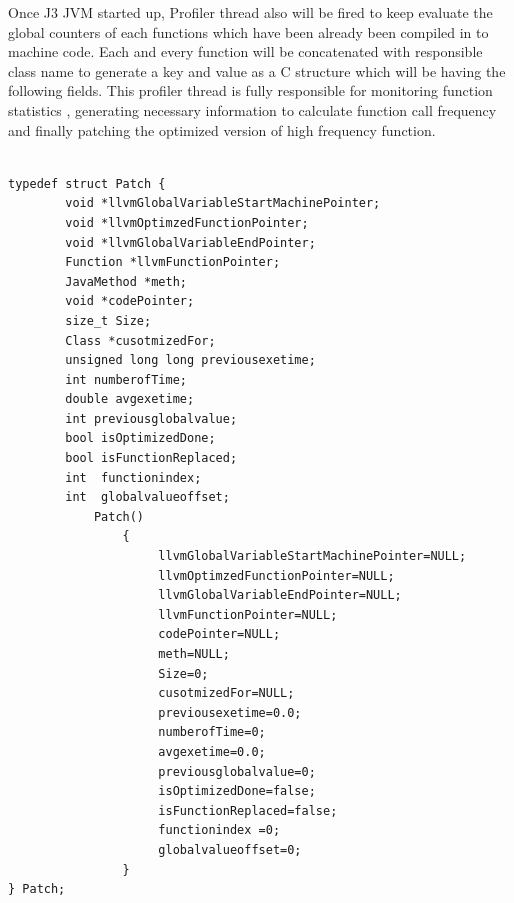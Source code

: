 Once J3 JVM started up, Profiler thread also will be fired to keep evaluate the global counters of each functions which have been already been compiled in to machine code.  Each and every function will be concatenated with responsible class name to generate a key and value as a C structure which will be having the following fields. This profiler thread is fully responsible for monitoring function statistics , generating necessary information to calculate function call frequency and finally patching the optimized version of high frequency function.
\scriptsize\begin{verbatim}
      
typedef struct Patch {
        void *llvmGlobalVariableStartMachinePointer;
        void *llvmOptimzedFunctionPointer;
        void *llvmGlobalVariableEndPointer;
        Function *llvmFunctionPointer;
        JavaMethod *meth;
        void *codePointer;
        size_t Size;
        Class *cusotmizedFor;
        unsigned long long previousexetime;
        int numberofTime;
        double avgexetime;
        int previousglobalvalue;
        bool isOptimizedDone;
        bool isFunctionReplaced;
        int  functionindex;
        int  globalvalueoffset;
            Patch()
                {
                     llvmGlobalVariableStartMachinePointer=NULL;
                     llvmOptimzedFunctionPointer=NULL;
                     llvmGlobalVariableEndPointer=NULL;
                     llvmFunctionPointer=NULL;
                     codePointer=NULL;
                     meth=NULL;
                     Size=0;
                     cusotmizedFor=NULL;
                     previousexetime=0.0;
                     numberofTime=0;
                     avgexetime=0.0;
                     previousglobalvalue=0;
                     isOptimizedDone=false;
                     isFunctionReplaced=false;
                     functionindex =0;
                     globalvalueoffset=0;
                }
} Patch;

\end{verbatim}
\normalsize



